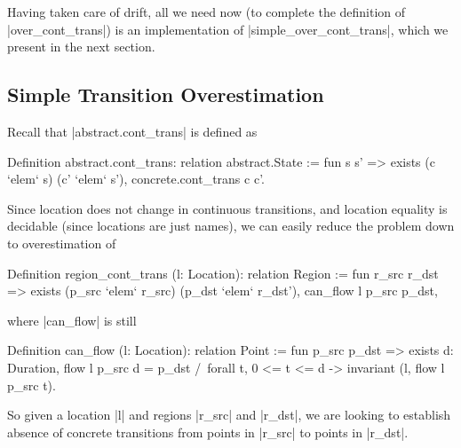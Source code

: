 \documentclass[runningheads]{llncs}
\begin{document}
{Having taken care of drift, all we need now (to complete the definition of |over_cont_trans|) is an implementation of |simple_over_cont_trans|, which we present in the next section.

\subsection{Simple Transition Overestimation}

Recall that |abstract.cont_trans| is defined as
\begin{code}
Definition abstract.cont_trans: relation abstract.State
  := fun s s' => exists (c `elem` s) (c' `elem` s'), concrete.cont_trans c c'.
\end{code}
Since location does not change in continuous transitions, and location equality is decidable (since locations are just names), we can easily reduce the problem down to overestimation of
\begin{code}
Definition region_cont_trans (l: Location): relation Region
  := fun r_src r_dst => exists (p_src `elem` r_src) (p_dst `elem` r_dst'), can_flow l p_src p_dst,
\end{code}
where |can_flow| is still
\begin{code}
Definition can_flow (l: Location): relation Point
  := fun p_src p_dst => exists d: Duration, flow l p_src d = p_dst /\
    forall t, 0 <= t <= d -> invariant (l, flow l p_src t).
\end{code}
So given a location |l| and regions |r_src| and |r_dst|, we are looking to establish absence of concrete transitions from points in |r_src| to points in |r_dst|.



}
\end{document}
